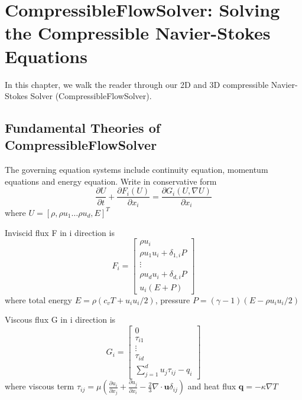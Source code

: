 \chapter{CompressibleFlowSolver: Solving the Compressible Navier-Stokes Equations}

In this chapter, we walk the reader through our 2D and 3D compressible Navier-Stokes Solver (CompressibleFlowSolver). 
\section{Fundamental Theories of CompressibleFlowSolver}
The governing equation systems include continuity equation, momentum equations and energy equation. Write in conservative form 
\begin{equation}\label{eq1}
  \frac{\partial U}{\partial t}+
  \frac{\partial F_{i}(U)}{\partial x_{i}}
  =\frac{\partial G_{i}(U,\nabla U)}{\partial x_{i}}
\end{equation}
where $U=[\rho,\rho u_{1} \hdots \rho u_{d},E]^{T}$

Inviscid flux F in i direction is
\begin{equation}
  F_{i}=
\begin{bmatrix}
  \rho u_{i}\\
  \rho u_{1}u_{i}+\delta_{1,i}P\\
  \vdots\\
  \rho u_{d}u_{i}+\delta_{d,i}P\\
  u_{i}(E+P)
\end{bmatrix}
\end{equation}
where total energy $E=\rho (c_{v}T+u_{i}u_{i}/2)$, pressure $P=(\gamma-1)(E-\rho u_{i}u_{i}/2)$

Viscous flux G in i direction is
\begin{equation}
  G_{i}=
\begin{bmatrix}
  0\\
  \tau_{i1}\\
  \vdots\\
  \tau_{id}\\
  \sum\limits_{j=1}^{d}{u_{j}\tau_{ij}}-q_{i}
\end{bmatrix}
\end{equation}
where viscous term $\tau_{ij}=\mu(\frac{\partial u_{i}}{\partial x_{j}}+\frac{\partial u_{j}}{\partial x_{i}}-\frac{2}{3}\nabla \cdot\textbf{u}\delta_{ij})$ and heat flux $\textbf{q}=-\kappa \nabla T$

